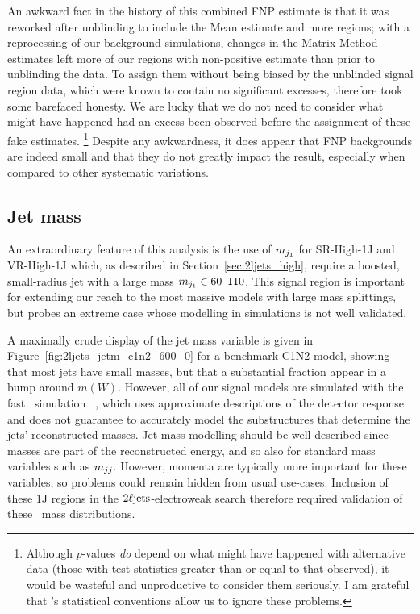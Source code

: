 An awkward fact in the history of this combined FNP estimate is that it
was reworked after unblinding to include the Mean estimate and more regions;
with a reprocessing of our background simulations, changes in the Matrix Method
estimates left more of our regions with non-positive estimate than prior to
unblinding the data.
To assign them without being biased by the unblinded signal region data,
which were known to contain no significant excesses, therefore took some
barefaced honesty.
We are lucky that we do not need to consider what might have happened had an
excess been observed before the assignment of these fake estimates.%
\footnote{%
Although $p$-values \emph{do} depend on what might have happened with
alternative data
(those with test statistics greater than or equal to that observed),
it would be wasteful and unproductive to consider them seriously.
I am grateful that \atlas's statistical conventions allow us to ignore these
problems.
}
Despite any awkwardness, it does appear that FNP backgrounds are indeed
small and that they do not greatly impact the result, especially when compared
to other systematic variations.


\subsection{Jet mass}
\label{sec:2ljets_jet_mass}
An extraordinary feature of this analysis is the use of $m_{j_1}$ for
SR-High-1J and VR-High-1J which, as described in Section~\ref{sec:2ljets_high},
require a boosted, small-radius jet with a large mass
$m_{j_1} \in 60\textrm{--}110$.
This signal region is important for extending our reach to the most massive
models with large mass splittings, but probes an extreme case whose modelling
in simulations is not well validated.

A maximally crude display of the jet mass variable is given in
Figure~\ref{fig:2ljets_jetm_c1n2_600_0} for a benchmark C1N2 model, showing
that most  jets have small masses, but that a substantial fraction appear in a
bump around $m(W)$.
However, all of our signal models are simulated with the fast \atlas\ simulation
\afii\ \cite{SOFT-2010-01}, which uses approximate descriptions of the
detector response and does not guarantee to accurately model the substructures
that determine the jets' reconstructed masses.
Jet mass modelling should be well described since masses are part of the
reconstructed energy, and so also for standard mass variables such as $m_{jj}$.
However, momenta are typically more important for these variables, so
problems could remain hidden from usual use-cases.
Inclusion of these 1J regions in the $2\ell\mathrm{jets}$-electroweak search therefore
required validation of these \afii\ mass distributions.

